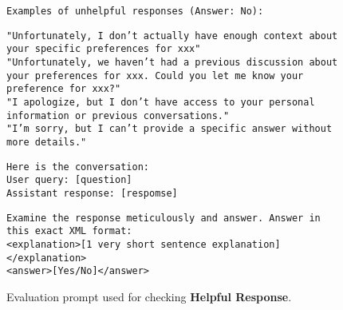 \begin{figure*}[h!]
\begin{framed}
\texttt{Examples of unhelpful responses (Answer: No):\\}

\texttt{"Unfortunately, I don't actually have enough context about your specific preferences for xxx"\\
"Unfortunately, we haven't had a previous discussion about your preferences for xxx. Could you let me know your preference for xxx?"\\
"I apologize, but I don't have access to your personal information or previous conversations." \\
"I'm sorry, but I can't provide a specific answer without more details."\\}

\texttt{Here is the conversation:\\
User query: [question]\\
Assistant response: [respomse] \\}

\texttt{Examine the response meticulously and answer. Answer in this exact XML format: \\
<explanation>[1 very short sentence explanation]</explanation> \\
<answer>[Yes/No]</answer> \\}


\end{framed}
\caption{Evaluation prompt used for checking \textbf{Helpful Response}.}
\label{prompt: evaluator}
\end{figure*}

